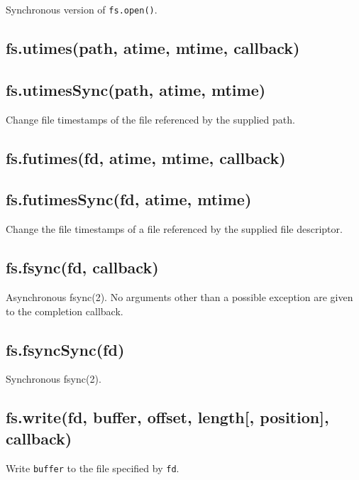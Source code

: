 Synchronous version of \texttt{fs.open()}.

\subsection{fs.utimes(path, atime, mtime,
callback)}\label{fs.utimespath-atime-mtime-callback}

\subsection{fs.utimesSync(path, atime,
mtime)}\label{fs.utimessyncpath-atime-mtime}

Change file timestamps of the file referenced by the supplied path.

\subsection{fs.futimes(fd, atime, mtime,
callback)}\label{fs.futimesfd-atime-mtime-callback}

\subsection{fs.futimesSync(fd, atime,
mtime)}\label{fs.futimessyncfd-atime-mtime}

Change the file timestamps of a file referenced by the supplied file
descriptor.

\subsection{fs.fsync(fd, callback)}\label{fs.fsyncfd-callback}

Asynchronous fsync(2). No arguments other than a possible exception are
given to the completion callback.

\subsection{fs.fsyncSync(fd)}\label{fs.fsyncsyncfd}

Synchronous fsync(2).

\subsection{fs.write(fd, buffer, offset, length{[}, position{]},
callback)}\label{fs.writefd-buffer-offset-length-position-callback}

Write \texttt{buffer} to the file specified by \texttt{fd}.

